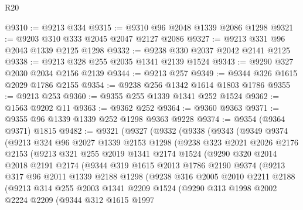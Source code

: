 \begin{lexlean}{R20}
\begin{coremodule}
@9310 := @9213 @334
@9315 := @9310 @96 @2048 @1339 @2086 @1298
@9321 := @9203 @310 @333 @2045 @2047 @2127 @2086
@9327 := @9213 @331 @96 @2043 @1339 @2125 @1298
@9332 := @9238 @330 @2037 @2042 @2141 @2125
@9338 := @9213 @328 @255 @2035 @1341 @2139 @1524
@9343 := @9290 @327 @2030 @2034 @2156 @2139
@9344 := @9213 @257
@9349 := @9344 @326 @1615 @2029 @1786 @2155
@9354 := @9238 @256 @1342 @1614 @1803 @1786
@9355 := @9213 @253
@9360 := @9355 @255 @1339 @1341 @252 @1524
@9362 := @1563 @9202 @11
@9363 := @9362 @252
@9364 := @9360 @9363
@9371 := @9355 @96 @1339 @1339 @252 @1298 @9363 @9228
@9374 := @9354 (@9364 @9371) @1815
@9482 := @9321
    (@9327
      (@9332
        (@9338
          (@9343
            (@9349
              @9374
              (@9213
                @324
                @96
                @2027
                @1339
                @2153
                @1298
                (@9238
                  @323
                  @2021
                  @2026
                  @2176
                  @2153
                  (@9213
                    @321
                    @255
                    @2019
                    @1341
                    @2174
                    @1524
                    (@9290
                      @320
                      @2014
                      @2018
                      @2191
                      @2174
                      (@9344
                        @319
                        @1615
                        @2013
                        @1786
                        @2190
                        @9374
                        (@9213
                          @317
                          @96
                          @2011
                          @1339
                          @2188
                          @1298
                          (@9238
                            @316
                            @2005
                            @2010
                            @2211
                            @2188
                            (@9213
                              @314
                              @255
                              @2003
                              @1341
                              @2209
                              @1524
                              (@9290
                                @313
                                @1998
                                @2002
                                @2224
                                @2209
                                (@9344
                                  @312
                                  @1615
                                  @1997

\end{coremodule}
\end{lexlean}
